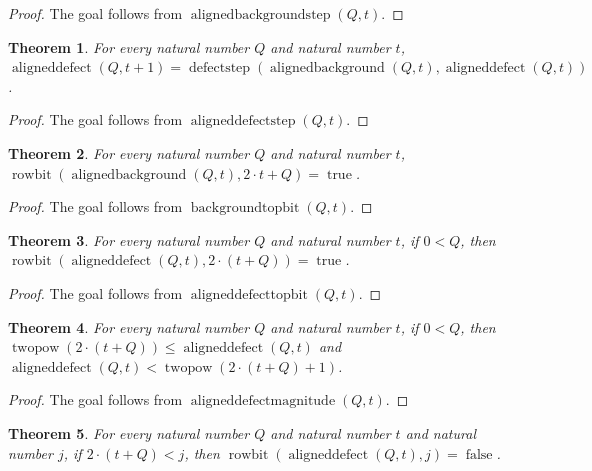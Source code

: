 \documentclass[11pt]{article}
\newtheorem{theorem}{Theorem}[section]
\theoremstyle{definition}
\begin{document}
\begin{proof}
The goal follows from \(\operatorname{alignedbackgroundstep}(Q, t)\).
\end{proof}
\begin{theorem}
\label{ll:observations:aligned-defect-step}
For every natural number \(Q\) and natural number \(t\), \(\operatorname{aligneddefect}(Q, t + 1) = \operatorname{defectstep}(\operatorname{alignedbackground}(Q, t), \operatorname{aligneddefect}(Q, t))\).
\end{theorem}
\begin{proof}
The goal follows from \(\operatorname{aligneddefectstep}(Q, t)\).
\end{proof}
\begin{theorem}
\label{ll:observations:background-top-bit}
For every natural number \(Q\) and natural number \(t\), \(\operatorname{rowbit}(\operatorname{alignedbackground}(Q, t), 2 \cdot t + Q) = \operatorname{true}\).
\end{theorem}
\begin{proof}
The goal follows from \(\operatorname{backgroundtopbit}(Q, t)\).
\end{proof}
\begin{theorem}
\label{ll:observations:aligned-defect-top-bit}
For every natural number \(Q\) and natural number \(t\), if \(0 < Q\), then \(\operatorname{rowbit}(\operatorname{aligneddefect}(Q, t), 2 \cdot (t + Q)) = \operatorname{true}\).
\end{theorem}
\begin{proof}
The goal follows from \(\operatorname{aligneddefecttopbit}(Q, t)\).
\end{proof}
\begin{theorem}
\label{ll:observations:aligned-defect-magnitude}
For every natural number \(Q\) and natural number \(t\), if \(0 < Q\), then \(\operatorname{twopow}(2 \cdot (t + Q)) \le \operatorname{aligneddefect}(Q, t)\) and \(\operatorname{aligneddefect}(Q, t) < \operatorname{twopow}(2 \cdot (t + Q) + 1)\).
\end{theorem}
\begin{proof}
The goal follows from \(\operatorname{aligneddefectmagnitude}(Q, t)\).
\end{proof}
\begin{theorem}
\label{ll:observations:aligned-defect-above-top}
For every natural number \(Q\) and natural number \(t\) and natural number \(j\), if \(2 \cdot (t + Q) < j\), then \(\operatorname{rowbit}(\operatorname{aligneddefect}(Q, t), j) = \operatorname{false}\).
\end{theorem}
\end{document}
